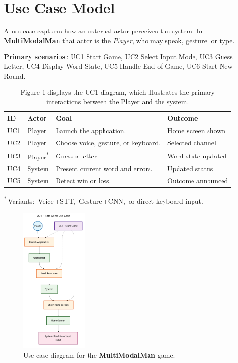 \section{Use Case Model}
A use case captures how an external actor perceives the system.  In \textbf{MultiModalMan} that actor is the \emph{Player}, who may speak, gesture, or type.

\noindent
\textbf{Primary scenarios}\,: UC1 Start Game, UC2 Select Input Mode, UC3 Guess Letter,  
UC4 Display Word State, UC5 Handle End of Game, UC6 Start New Round.

\begin{table}[h]
\centering
\caption{Figure \ref{fig:uc-diagram} displays the UC1 diagram, which illustrates the primary interactions between the Player and the system.}
\begin{tabularx}{\linewidth}{@{}l l X X@{}}
\toprule
\textbf{ID} & \textbf{Actor} & \textbf{Goal} & \textbf{Outcome} \\
\midrule
UC1 & Player  & Launch the application.                    & Home screen shown\\
UC2 & Player  & Choose voice, gesture, or keyboard.        & Selected channel \\
UC3 & Player\textsuperscript{*} & Guess a letter.          & Word state updated \\
UC4 & System  & Present current word and errors.           & Updated status\\
UC5 & System  & Detect win or loss.                        & Outcome announced\\
\bottomrule
\end{tabularx}
\footnotesize\textsuperscript{*}\,Variants:\ Voice\,+STT,\ Gesture\,+CNN,\ or direct keyboard input.
\end{table}

\begin{figure}[h]
  \centering
  \includegraphics[width=0.3\textwidth]{./images/uc1_start_game.png}
  \caption{Use case diagram for the \textbf{MultiModalMan} game.}
  \label{fig:uc-diagram}
\end{figure}

